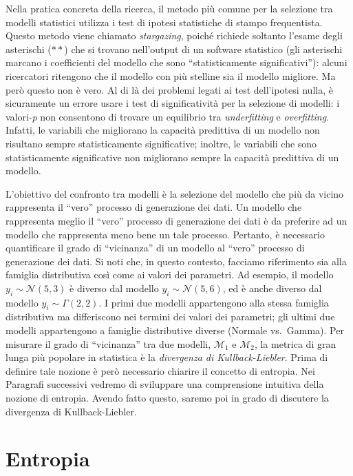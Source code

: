 \documentclass[
  10pt,
  italian,
  a4paper,
  extrafontsizes,onecolumn,openright
  ]{memoir}
\newlength{\rf}
\theoremstyle{definition}
\theoremstyle{definition}
\theoremstyle{definition}
\theoremstyle{definition}
\theoremstyle{remark}
\begin{document}
Nella pratica concreta della ricerca, il metodo più comune per la selezione tra modelli statistici utilizza i test di ipotesi statistiche di stampo frequentista. Questo metodo viene chiamato \emph{stargazing}, poiché richiede soltanto l'esame degli asterischi (\(**\)) che si trovano nell'output di un software statistico (gli asterischi marcano i coefficienti del modello che sono ``statisticamente significativi''): alcuni ricercatori ritengono che il modello con più stelline sia il modello migliore. Ma però questo non è vero. Al di là dei problemi legati ai test dell'ipotesi nulla, è sicuramente un errore usare i test di significatività per la selezione di modelli: i valori-\emph{p} non consentono di trovare un equilibrio tra \emph{underfitting} e \emph{overfitting}. Infatti, le variabili che migliorano la capacità predittiva di un modello non risultano sempre statisticamente significative; inoltre, le variabili che sono statisticamente significative non migliorano sempre la capacità predittiva di un modello.

L'obiettivo del confronto tra modelli è la selezione del modello che più da vicino rappresenta il ``vero'' processo di generazione dei dati. Un modello che rappresenta meglio il ``vero'' processo di generazione dei dati è da preferire ad un modello che rappresenta meno bene un tale processo. Pertanto, è necessario quantificare il grado di ``vicinanza'' di un modello al ``vero'' processo di generazione dei dati. Si noti che, in questo contesto, facciamo riferimento sia alla famiglia distributiva così come ai valori dei parametri. Ad esempio, il modello \(y_i \sim \mathcal{N}(5, 3)\) è diverso dal modello \(y_i \sim \mathcal{N}(5, 6)\), ed è anche diverso dal modello \(y_i \sim \Gamma(2, 2)\). I primi due modelli appartengono alla stessa famiglia distributiva ma differiscono nei termini dei valori dei parametri; gli ultimi due modelli appartengono a famiglie distributive diverse (Normale vs.~Gamma). Per misurare il grado di ``vicinanza'' tra due modelli, \(\mathcal{M}_1\) e \(\mathcal{M}_2\), la metrica di gran lunga più popolare in statistica è la \emph{divergenza di Kullback-Liebler}. Prima di definire tale nozione è però necessario chiarire il concetto di entropia. Nei Paragrafi successivi vedremo di sviluppare una comprensione intuitiva della nozione di entropia. Avendo fatto questo, saremo poi in grado di discutere la divergenza di Kullback-Liebler.

\hypertarget{entropia}{%
\section{Entropia}\label{entropia}}
\end{document}
